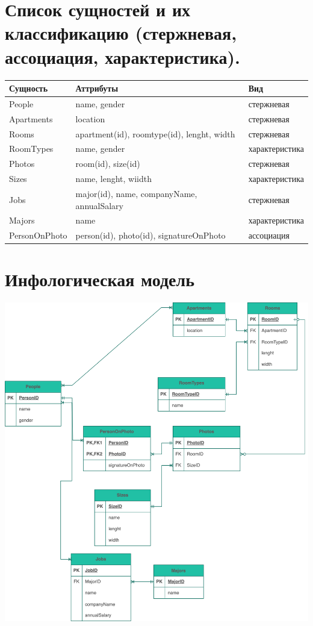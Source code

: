 \documentclass[12pt,onecolumn]{article}
\begin{document}
\section{Список сущностей и их классификацию (стержневая, ассоциация, характеристика).}
\begin{longtable}{|l|l|l|}
  \hline
  \textbf{Сущность}     & \textbf{Аттрибуты}                         & \textbf{Вид}   \\ \hline
  \endfirsthead
  \endhead
  People                & name, gender                               & стержневая     \\ \hline
  Apartments            & location                                   & стержневая     \\ \hline
  Rooms                 & apartment(id), roomtype(id), lenght, width & стержневая     \\ \hline
  RoomTypes             & name, gender                               & характеристика \\ \hline
  Photos                & room(id), size(id)                         & стержневая     \\ \hline
  Sizes                 & name, lenght, wiidth                       & характеристика \\ \hline
  Jobs                  & major(id), name, companyName, annualSalary & стержневая     \\ \hline
  Majors                & name                                       & характеристика \\ \hline
  PersonOnPhoto         & person(id), photo(id), signatureOnPhoto    & ассоциация     \\ \hline
\end{longtable}
\section{Инфологическая модель}
\includegraphics[width=\textwidth]{image/Infological-model.png}
\end{document}
